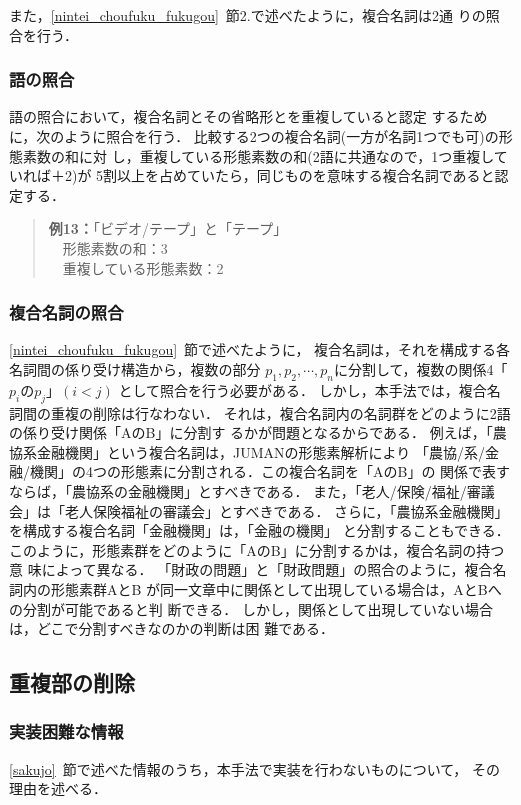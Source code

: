 また，\ref{nintei_choufuku_fukugou}~節2.で述べたように，複合名詞は2通
りの照合を行う．

\subsubsection{語の照合} \label{jitsu_nintei_go}
語の照合において，複合名詞とその省略形とを重複していると認定
するために，次のように照合を行う．
比較する2つの複合名詞(一方が名詞1つでも可)の形態素数の和に対
し，重複している形態素数の和(2語に共通なので，1つ重複していれば＋2)が
5割以上を占めていたら，同じものを意味する複合名詞であると認定する．
\vspace{5mm}\begin{quote}
{\bf 例13：}「ビデオ/テープ」と「テープ」\\
　形態素数の和：3\\
　重複している形態素数：2
\end{quote}\vspace{5mm}

\subsubsection{複合名詞の照合} \label{jitsu_nintei_fukugou}
\ref{nintei_choufuku_fukugou}~節で述べたように，
複合名詞は，それを構成する各名詞間の係り受け構造から，複数の部分
$p_{1},p_{2},\cdots,p_{n}$に分割して，複数の関係4「$p_{i}$の$p_{j}$」$(i<j)$
として照合を行う必要がある．
しかし，本手法では，複合名詞間の重複の削除は行なわない．
それは，複合名詞内の名詞群をどのように2語の係り受け関係「AのB」に分割す
るかが問題となるからである．
例えば，「農協系金融機関」という複合名詞は，JUMANの形態素解析により
「農協/系/金融/機関」の4つの形態素に分割される．この複合名詞を「AのB」の
関係で表すならば，「農協系の金融機関」とすべきである．
また，「老人/保険/福祉/審議会」は「老人保険福祉の審議会」とすべきである．
さらに，「農協系金融機関」を構成する複合名詞「金融機関」は，「金融の機関」
と分割することもできる．
このように，形態素群をどのように「AのB」に分割するかは，複合名詞の持つ意
味によって異なる．
「財政の問題」と「財政問題」の照合のように，複合名詞内の形態素群AとB
が同一文章中に関係として出現している場合は，AとBへの分割が可能であると判
断できる．
しかし，関係として出現していない場合は，どこで分割すべきなのかの判断は困
難である．

\subsection{重複部の削除} \label{jitsu_sakujo}
\subsubsection{実装困難な情報} \label{jitsu_sakujo_konnan}
\ref{sakujo}~節で述べた情報のうち，本手法で実装を行わないものについて，
その理由を述べる．


